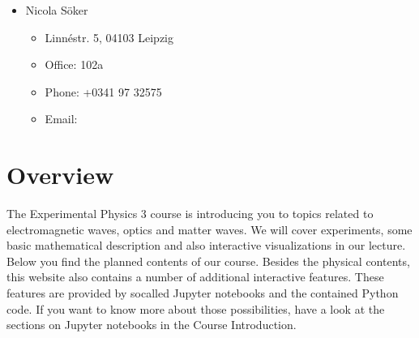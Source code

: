 \documentclass[letterpaper,10pt,english]{sphinxmanual}
\begin{document}
\begin{DUlineblock}{0em}
\item[] 
\end{DUlineblock}
\begin{itemize}
\item {} 
Nicola Söker
\begin{itemize}
\item {} 
Linnéstr. 5, 04103 Leipzig

\item {} 
Office: 102a

\item {} 
Phone: +0341 97 32575

\item {} 
Email: 

\end{itemize}

\end{itemize}


\section{Overview}
\label{\detokenize{lectures/Intro/overview:overview}}\label{\detokenize{lectures/Intro/overview::doc}}
The Experimental Physics 3 course is introducing you to topics related to electromagnetic waves, optics and matter waves.
We will cover experiments, some basic mathematical description and also interactive visualizations in our lecture. Below
you find the planned contents of our course. Besides the physical contents, this website also contains a number of additional
interactive features. These features are provided by so\sphinxhyphen{}called Jupyter notebooks and the contained Python code. If you want to know more about those possibilities, have a look at the sections on Jupyter notebooks in the Course Introduction.



\begin{DUlineblock}{0em}
\item[] 
\end{DUlineblock}
\end{document}
